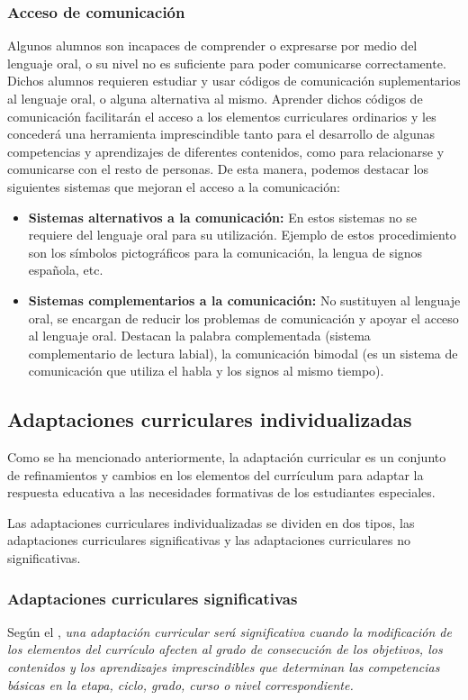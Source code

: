 \subsubsection{Acceso de comunicación}
Algunos alumnos son incapaces de comprender o expresarse por medio del lenguaje oral, o su nivel no es suficiente para poder comunicarse correctamente. Dichos alumnos requieren estudiar y usar códigos de comunicación suplementarios al lenguaje oral, o alguna alternativa al mismo. Aprender dichos códigos de comunicación facilitarán el acceso a los elementos curriculares ordinarios y les concederá una herramienta imprescindible tanto para el desarrollo de algunas competencias y aprendizajes de diferentes contenidos, como para relacionarse y comunicarse con el resto de personas. De esta manera, podemos destacar los siguientes sistemas que mejoran el acceso a la comunicación:
\begin{itemize}
    \item \textbf{Sistemas alternativos a la comunicación:} En estos sistemas no se requiere del lenguaje oral para su utilización. Ejemplo de estos procedimiento son los símbolos pictográficos para la comunicación, la lengua de signos española, etc.

    \item \textbf{Sistemas complementarios a la comunicación:} No sustituyen al lenguaje oral, se encargan de reducir los problemas de comunicación y apoyar el acceso al lenguaje oral. Destacan la palabra complementada (sistema complementario de lectura labial), la comunicación bimodal (es un sistema de comunicación que utiliza el habla y los signos al mismo tiempo).
\end{itemize}

\subsection{Adaptaciones curriculares individualizadas}

Como se ha mencionado anteriormente, la adaptación curricular es un conjunto de refinamientos y cambios en los elementos del currículum para adaptar la respuesta educativa a las necesidades formativas de los estudiantes especiales.

Las adaptaciones curriculares individualizadas se dividen en dos tipos, las adaptaciones curriculares significativas y las adaptaciones curriculares no significativas.
\subsubsection{Adaptaciones curriculares significativas}
Según el \citep[p. 7, Artículo 8]{BOE}, \textit{una adaptación curricular será significativa cuando la modificación de los elementos del currículo afecten al grado de consecución de los objetivos, los contenidos y los aprendizajes imprescindibles que determinan las competencias básicas en la etapa, ciclo, grado, curso o nivel correspondiente.}
\newline

